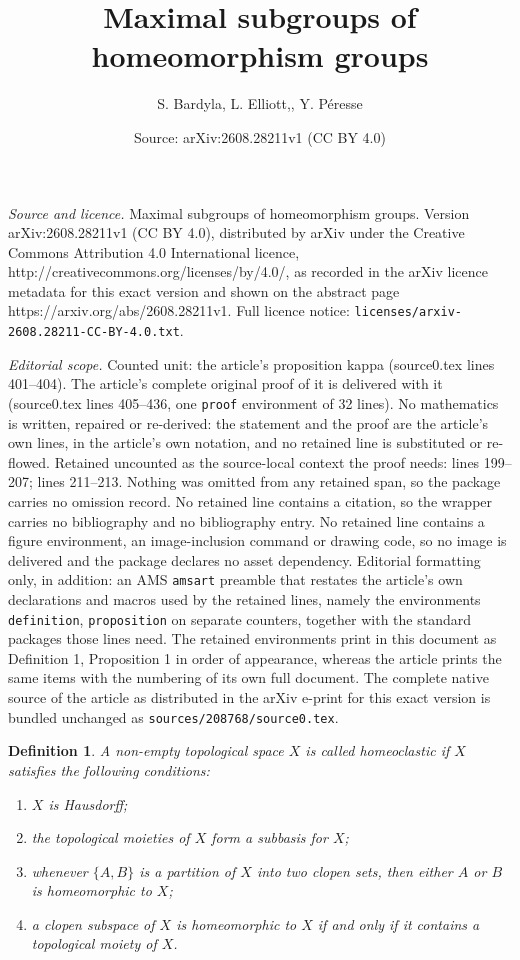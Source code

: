 \documentclass[10pt,a4paper]{amsart}
\title{Maximal subgroups of homeomorphism groups}
\author{S. Bardyla, L. Elliott,, Y. P\'eresse}
\date{Source: arXiv:2608.28211v1 (CC BY 4.0)}
\newtheorem{definition}{Definition}
\begin{document}
\maketitle

\noindent\emph{Source and licence.} Maximal subgroups of homeomorphism groups. Version arXiv:2608.28211v1 (CC BY 4.0), distributed by arXiv under the Creative Commons Attribution 4.0 International licence, http://creativecommons.org/licenses/by/4.0/, as recorded in the arXiv licence metadata for this exact version and shown on the abstract page https://arxiv.org/abs/2608.28211v1. Full licence notice: \texttt{licenses/arxiv-2608.28211-CC-BY-4.0.txt}.\par\smallskip

\noindent\textit{Editorial scope.} Counted unit: the article's proposition kappa (source0.tex lines 401--404). The article's complete original proof of it is delivered with it (source0.tex lines 405--436, one \texttt{proof} environment of 32 lines). No mathematics is written, repaired or re-derived: the statement and the proof are the article's own lines, in the article's own notation, and no retained line is substituted or re-flowed.  Retained uncounted as the source-local context the proof needs: lines 199--207; lines 211--213.  Nothing was omitted from any retained span, so the package carries no omission record.  No retained line contains a citation, so the wrapper carries no bibliography and no bibliography entry.  No retained line contains a figure environment, an image-inclusion command or drawing code, so no image is delivered and the package declares no asset dependency.  Editorial formatting only, in addition: an AMS \texttt{amsart} preamble that restates the article's own declarations and macros used by the retained lines, namely the environments \texttt{definition}, \texttt{proposition} on separate counters, together with the standard packages those lines need.  The retained environments print in this document as Definition 1, Proposition 1 in order of appearance, whereas the article prints the same items with the numbering of its own full document.  The complete native source of the article as distributed in the arXiv e-print for this exact version is bundled unchanged as \texttt{sources/208768/source0.tex}.
\begin{definition}\label{clastic}
    A non-empty topological space \(X\) is called \emph{homeoclastic} if \(X\) satisfies the following conditions:
    \begin{enumerate}
        \item \(X\) is Hausdorff;
        \item the topological moieties of \(X\) form a subbasis for \(X\);
         \item whenever \(\{A,B\}\) is a partition of \(X\) into two clopen sets, then either \(A\) or \(B\) is homeomorphic to \(X\);
        \item a clopen subspace of \(X\) is homeomorphic to \(X\) if and only if it contains a topological moiety of \(X\).
    \end{enumerate}
\end{definition}
\end{document}
